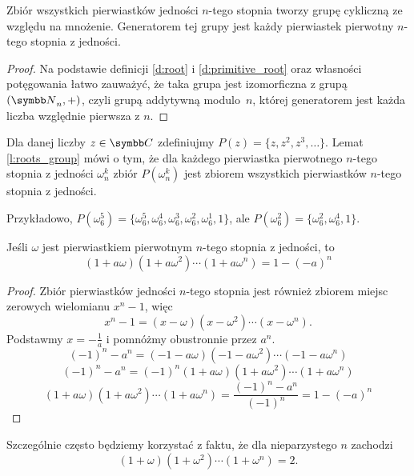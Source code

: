 \documentclass[bibliography=totocnumbered]{scrartcl}
\begin{document}
    \begin{lemma}
        \label{l:roots_group}
        Zbiór wszystkich pierwiastków jedności $n$-tego stopnia tworzy grupę cykliczną ze względu na mnożenie. Generatorem tej grupy jest każdy pierwiastek pierwotny $n$-tego stopnia z jedności.
    \end{lemma}
    \begin{proof}
        Na podstawie definicji \ref{d:root} i \ref{d:primitive_root} oraz własności potęgowania łatwo zauważyć, że taka grupa jest izomorficzna z grupą $(\NN_n, +)$, czyli grupą addytywną modulo~$n$, której generatorem jest każda liczba względnie pierwsza z $n$.
    \end{proof}

    \begin{remark*}
        Dla danej liczby $z \in \CC$ zdefiniujmy $P(z) = \{z, z^2, z^3, \ldots\}$. Lemat \ref{l:roots_group} mówi o tym, że dla każdego pierwiastka pierwotnego $n$-tego stopnia z jedności $\omega_n^k$ zbiór $P(\omega_n^k)$ jest zbiorem wszystkich pierwiastków $n$-tego stopnia z jedności.

        Przykładowo, $P(\omega_6^5) = \{\omega_6^5, \omega_6^4, \omega_6^3, \omega_6^2, \omega_6^1, 1\}$, ale $P(\omega_6^2) = \{\omega_6^2, \omega_6^4, 1\}$.
    \end{remark*}

    \begin{lemma}
        \label{l:roots_plus_one_prod}
        Jeśli $\omega$ jest pierwiastkiem pierwotnym $n$-tego stopnia z jedności, to
        $$ (1 + a\omega)(1 + a\omega^2)\cdots(1 + a\omega^n) = 1 - (-a)^n $$
    \end{lemma}
    \begin{proof}
        Zbiór pierwiastków jedności $n$-tego stopnia jest również zbiorem miejsc zerowych wielomianu $x^n - 1$, więc
        $$ x^n - 1 = (x - \omega)(x - \omega^2)\cdots(x - \omega^n). $$
        Podstawmy $x = -\frac{1}{a}$ i pomnóżmy obustronnie przez $a^n$.
        $$ (-1)^n - a^n = (-1 - a\omega)(-1 - a\omega^2)\cdots(-1 - a\omega^n) $$
        $$ (-1)^n - a^n = (-1)^n(1 + a\omega)(1 + a\omega^2)\cdots(1 + a\omega^n) $$
        $$ (1 + a\omega)(1 + a\omega^2)\cdots(1 + a\omega^n) = \frac{(-1)^n - a^n}{(-1)^n} = 1 - (-a)^n $$
    \end{proof}

    Szczególnie często będziemy korzystać z faktu, że dla nieparzystego $n$ zachodzi
    $$ (1 + \omega)(1 + \omega^2)\cdots(1 + \omega^n) = 2. $$
\end{document}
